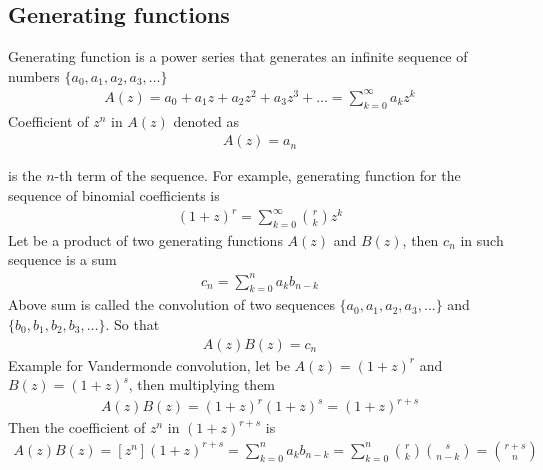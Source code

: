 ﻿\subsection{Generating functions}\label{subsec:generating-functions}
Generating function is a power series that generates an infinite sequence of numbers
$\{a_0, a_1, a_2, a_3, \dots \}$
\begin{align*}
    A(z) = a_0 + a_1 z + a_2 z^2 + a_3 z^3 + \dots = \sum_{k=0}^{\infty} a_k z^k
\end{align*}
Coefficient of $z^n$ in $A(z)$ denoted as
\begin{align*}
[z^n]
    A(z) = a_n
\end{align*}

is the $n$-th term of the sequence.
For example, generating function for the sequence of binomial coefficients is
\begin{align*}
(1+z)^r = \sum_{k=0}^{\infty} \binom{r}{k} z^k
\end{align*}
Let be a product of two generating functions $A(z)$ and $B(z)$, then $c_n$ in such sequence is a sum
\begin{align*}
    c_n = \sum_{k=0}^{n} a_k b_{n-k}
\end{align*}
Above sum is called the convolution of two sequences $\{a_0, a_1, a_2, a_3, \dots \}$ and $\{b_0, b_1, b_2, b_3, \dots \}$.
So that
\begin{align*}
[z^n]
    A(z) B(z) = c_n
\end{align*}
Example for Vandermonde convolution, let be $A(z)=(1+z)^r$ and $B(z)=(1+z)^s$, then multiplying them
\begin{align*}
    A(z) B(z) = (1+z)^{r} (1+z)^{s} = (1+z)^{r+s}
\end{align*}
Then the coefficient of $z^n$ in $(1+z)^{r+s}$ is
\begin{align*}
[z^n]
    A(z) B(z) = [z^n] (1+z)^{r+s} = \sum_{k=0}^{n} a_k b_{n-k}= \sum_{k=0}^{n} \binom{r}{k} \binom{s}{n-k} = \binom{r+s}{n}
\end{align*}
